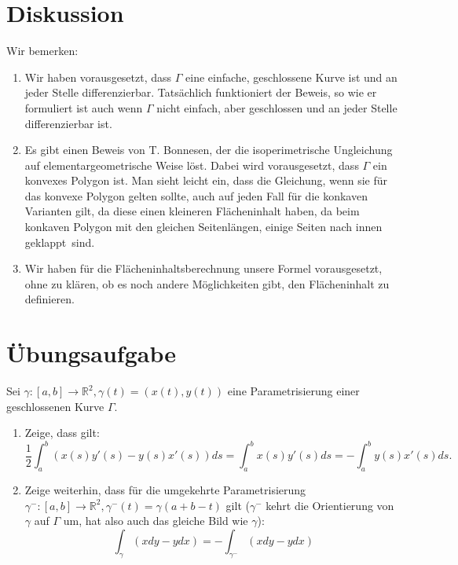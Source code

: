 \documentclass[12pt,a4paper]{article}
\theoremstyle{plain}
\newcommand{\R}{\mathbb{R}}
\numberwithin{equation}{section}
\begin{document}
\section{Diskussion}
Wir bemerken:
\begin{enumerate}
\item Wir haben vorausgesetzt, dass $\Gamma$ eine einfache, geschlossene Kurve ist und an jeder Stelle differenzierbar. Tatsächlich funktioniert der Beweis, so wie er formuliert ist auch wenn $\Gamma$ nicht einfach, aber geschlossen und an jeder Stelle differenzierbar ist.
\item Es gibt einen Beweis von T. Bonnesen, der die isoperimetrische Ungleichung auf elementargeometrische Weise löst. Dabei wird vorausgesetzt, dass $\Gamma$ ein konvexes Polygon ist. Man sieht leicht ein, dass die Gleichung, wenn sie für das konvexe Polygon gelten sollte, auch auf jeden Fall für die konkaven Varianten gilt, da diese einen kleineren Flächeninhalt haben, da beim konkaven Polygon mit den gleichen Seitenlängen, einige Seiten \glqq nach innen geklappt\grqq\ sind.
\item Wir haben für die Flächeninhaltsberechnung unsere Formel vorausgesetzt, ohne zu klären, ob es noch andere Möglichkeiten gibt, den Flächeninhalt zu definieren.
\end{enumerate}
\section{Übungsaufgabe}
Sei $\gamma:[a,b]\rightarrow \R^2, \gamma(t)=(x(t),y(t))$ eine Parametrisierung einer geschlossenen Kurve $\Gamma$. 
\begin{enumerate}
\renewcommand{\labelenumi}{(\alph{enumi})}
\item Zeige, dass gilt:
\[
\frac{1}{2}\int_a^b (x(s)y'(s)-y(s)x'(s)) ds= \int_a^b x(s)y'(s)ds = -\int_a^b y(s)x'(s)ds .
\]
\item Zeige weiterhin, dass für die umgekehrte Parametrisierung $\gamma^{-}:[a,b]\rightarrow \R^2, \gamma^-(t)=\gamma(a+b-t)$ gilt ($\gamma^-$ kehrt die Orientierung von $\gamma$ auf $\Gamma$ um, hat also auch das gleiche Bild wie $\gamma$):
\[
\int_\gamma (x dy -y dx) = -\int_{\gamma^-} (x dy -y dx)
\]
\end{enumerate}
\end{document}
